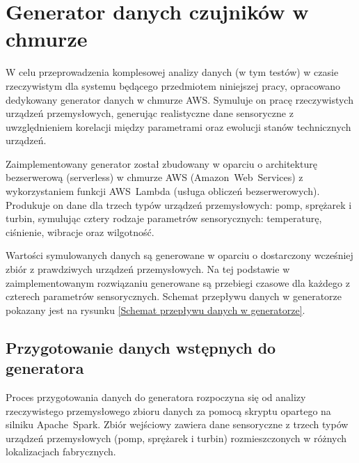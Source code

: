 \section{Generator danych czujników w chmurze}
\label{sec:implementacja_generowania}


W celu przeprowadzenia komplesowej analizy danych (w tym testów) w czasie rzeczywistym dla systemu będącego przedmiotem niniejszej pracy, opracowano dedykowany generator danych w chmurze AWS. Symuluje on pracę rzeczywistych urządzeń przemysłowych, generując realistyczne dane sensoryczne z uwzględnieniem korelacji między parametrami oraz ewolucji stanów technicznych urządzeń.

Zaimplementowany generator został zbudowany w oparciu o architekturę bezserwerową (serverless) w chmurze AWS (\mbox{Amazon Web Services}) z wykorzystaniem funkcji \mbox{AWS Lambda} (usługa obliczeń bezserwerowych). Produkuje on dane dla trzech typów urządzeń przemysłowych: pomp, sprężarek i turbin, symulując cztery rodzaje parametrów sensorycznych: temperaturę, ciśnienie, wibracje oraz wilgotność.

Wartości symulowanych danych są generowane w oparciu o dostarczony wcześniej zbiór z prawdziwych urządzeń przemysłowych. Na tej podstawie w zaimplementowanym rozwiązaniu generowane są przebiegi czasowe dla każdego z czterech parametrów sensorycznych. Schemat przepływu danych w generatorze pokazany jest na rysunku \ref{Schemat przepływu danych w generatorze}.


\subsection{Przygotowanie danych wstępnych do generatora}

Proces przygotowania danych do generatora rozpoczyna się od analizy rzeczywistego przemysłowego zbioru danych za pomocą skryptu opartego na silniku \mbox{Apache Spark}. Zbiór wejściowy zawiera dane sensoryczne z trzech typów urządzeń przemysłowych (pomp, sprężarek i turbin) rozmieszczonych w różnych lokalizacjach fabrycznych.


